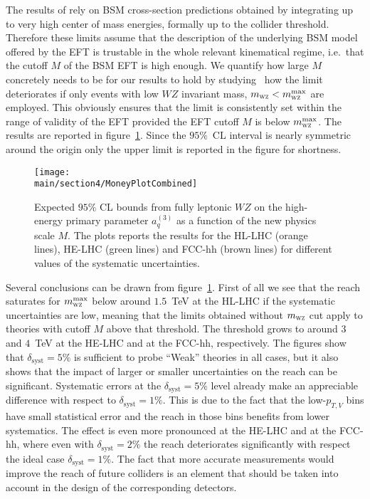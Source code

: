 \documentclass[../report.tex]{subfiles}
\providecommand{\main}{..}
\begin{document}
The results of   rely on BSM cross-section predictions obtained by integrating up to very high center of mass energies, formally up to the collider threshold. Therefore these limits assume that the description of the underlying BSM model offered by the EFT is trustable in the whole relevant kinematical regime, i.e.~that the cutoff $M$ of the BSM EFT is high enough. We quantify how large $M$ concretely needs to be for our results to hold by studying~\cite{Racco:2015dxa,Pobbe:2017wrj,Biekoetter:2014jwa} how the limit deteriorates if only events with low $WZ$ invariant mass, $m_{\textsc{wz}}<m_{\textsc{wz}}^{\rm{max}}$ are employed. This obviously ensures that the limit is consistently set within the range of validity of the EFT provided the EFT cutoff $M$ is below $m_{\textsc{wz}}^{\rm{max}}$. The results are reported in figure~\ref{fig:bounds_future}. Since the $95\%$~CL interval is nearly symmetric around the origin only the upper limit is reported in the figure for shortness.

\begin{figure}[t]
\centering
\texttt{[image: \\main/section4/MoneyPlotCombined]}
\caption{Expected $95\%$ CL bounds from fully leptonic $WZ$ on the high-energy primary parameter $a^{(3)}_q$ as a function of the new physics scale $M$. The plots reports the results for the HL-LHC (orange lines), HE-LHC (green lines) and FCC-hh (brown lines) for different
values of the systematic uncertainties.} 
\label{fig:bounds_future}
\end{figure}

Several conclusions can be drawn from figure~\ref{fig:bounds_future}. First of all we see that the reach saturates for $m_{\textsc{wz}}^{\rm{max}}$ below around $1.5$~TeV at the HL-LHC if the systematic uncertainties are low, meaning that the limits obtained without $m_{\textsc{wz}}$ cut apply to theories with cutoff $M$ above that threshold.  The threshold grows to around $3$ and $4$~TeV at the HE-LHC and at the FCC-hh, respectively. The figures show that $\delta_{\textrm{syst}}=5\%$ is sufficient to probe ``Weak'' theories in all cases, but it also shows that the impact of larger or smaller uncertainties on the reach can be significant. Systematic errors at the $\delta_{\textrm{syst}}=5\%$ level already make an appreciable difference with respect to $\delta_{\textrm{syst}}=1\%$. This is due to the fact that the low-$p_{T,V}$ bins have small statistical error and the reach in those bins benefits from lower systematics. The effect is even more pronounced at the HE-LHC and at the FCC-hh, where even with $\delta_{\textrm{syst}}=2\%$ the reach deteriorates significantly with respect the ideal case $\delta_{\textrm{syst}}=1\%$. The fact that more accurate measurements would improve the reach of future colliders is an element that should be taken into account in the design of the corresponding detectors.
\end{document}

